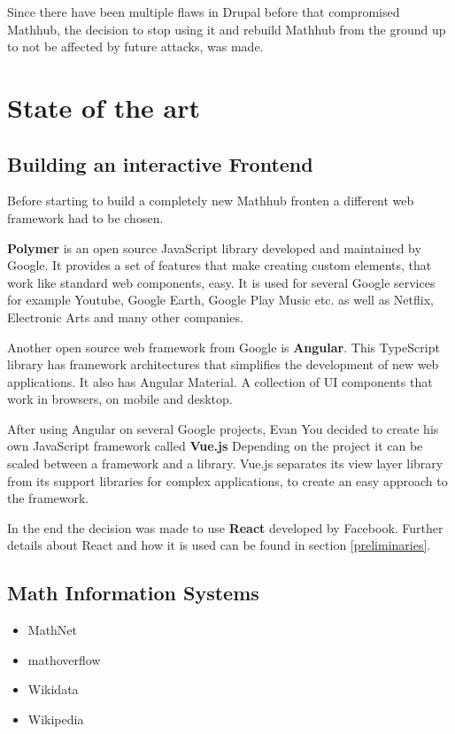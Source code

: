 \documentclass[11pt,a4paper]{article}
\begin{document}
Since there have been multiple flaws in Drupal before that compromised Mathhub, the decision to stop using it and rebuild Mathhub from the ground up to not be affected by future attacks, was made.

\section{State of the art}
\subsection{Building an interactive Frontend}
Before starting to build a completely new Mathhub fronten a different web framework had to be chosen.

\textbf{Polymer} is an open source JavaScript library developed and maintained by Google.
It provides a set of features that make creating custom elements, that work like standard web components, easy. 
It is used for several Google services for example Youtube, Google Earth, Google Play Music etc. as well as Netflix, Electronic Arts and many other companies. \cite{polymer}

Another open source web framework from Google is \textbf{Angular}.
This TypeScript library has framework architectures that simplifies the development of new web applications.
It also has Angular Material. A collection of UI components that work in browsers, on mobile and desktop. \cite{angular}

After using Angular on several Google projects, Evan You decided to create his own JavaScript framework called \textbf{Vue.js} \cite{vuewiki}
Depending on the project it can be scaled between a framework and a library.
Vue.js separates its view layer library from its support libraries for complex applications, to create an easy approach to the framework. \cite{vuegit}

In the end the decision was made to use \textbf{React} developed by Facebook. Further details about React and how it is used can be found in section \ref{preliminaries}.

\subsection{Math Information Systems}
\begin{itemize}
\item MathNet
\item mathoverflow
\item Wikidata
\item Wikipedia
\end{itemize}
\end{document}
